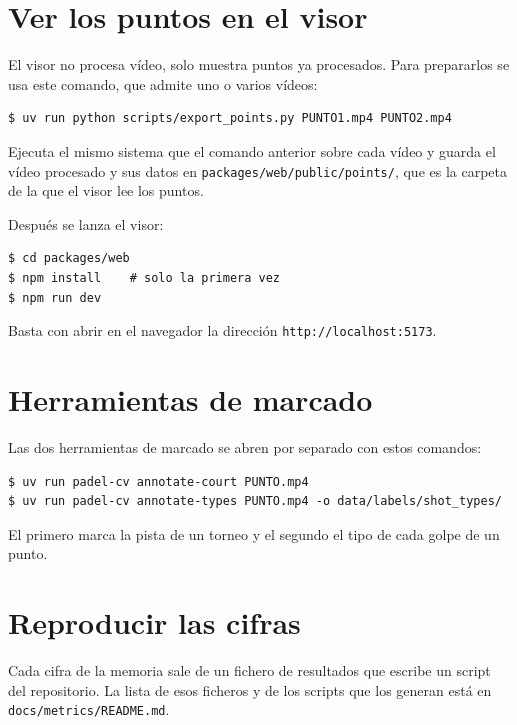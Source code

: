 \section{Ver los puntos en el visor}

El visor no procesa vídeo, solo muestra puntos ya procesados.
Para prepararlos se usa este comando, que admite uno o varios vídeos:
\begin{lstlisting}[style=terminal]
$ uv run python scripts/export_points.py PUNTO1.mp4 PUNTO2.mp4
\end{lstlisting}
Ejecuta el mismo sistema que el comando anterior sobre cada vídeo y guarda el vídeo procesado y sus datos en \texttt{packages/web/public/points/}, que es la carpeta de la que el visor lee los puntos.

Después se lanza el visor:
\begin{lstlisting}[style=terminal]
$ cd packages/web
$ npm install    # solo la primera vez
$ npm run dev
\end{lstlisting}
Basta con abrir en el navegador la dirección \texttt{http://localhost:5173}.

\section{Herramientas de marcado}

Las dos herramientas de marcado se abren por separado con estos comandos:
\begin{lstlisting}[style=terminal]
$ uv run padel-cv annotate-court PUNTO.mp4
$ uv run padel-cv annotate-types PUNTO.mp4 -o data/labels/shot_types/
\end{lstlisting}
El primero marca la pista de un torneo y el segundo el tipo de cada golpe de un punto.

\section{Reproducir las cifras}

Cada cifra de la memoria sale de un fichero de resultados que escribe un script del repositorio.
La lista de esos ficheros y de los scripts que los generan está en \texttt{docs/metrics/README.md}.
